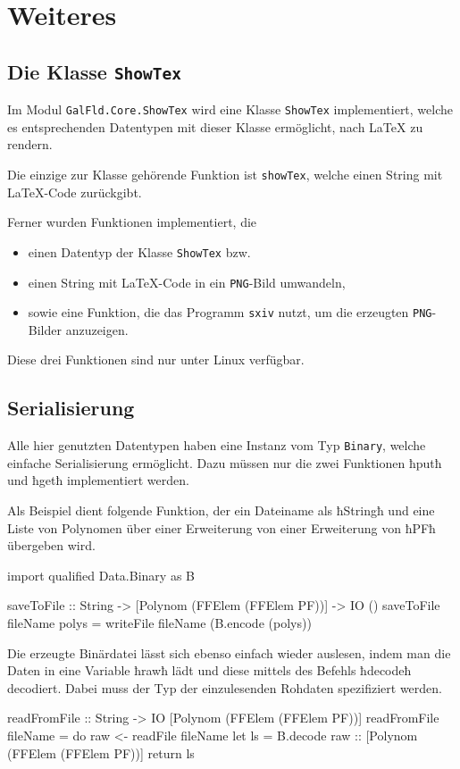 \section{Weiteres}
\subsection{Die Klasse \texttt{ShowTex}}
Im Modul \texttt{GalFld.Core.ShowTex} wird eine Klasse \texttt{ShowTex}
implementiert, welche es entsprechenden Datentypen mit dieser Klasse
ermöglicht, nach \LaTeX{} zu rendern.

Die einzige zur Klasse gehörende Funktion ist \texttt{showTex}, welche einen
String mit \LaTeX{}-Code zurückgibt.

Ferner wurden Funktionen implementiert, die 
\begin{itemize}
  \item einen Datentyp der Klasse \texttt{ShowTex} bzw.
  \item einen String mit \LaTeX{}-Code in ein \texttt{PNG}-Bild umwandeln,
  \item sowie eine Funktion, die das Programm \texttt{sxiv} nutzt, 
    um die erzeugten \texttt{PNG}-Bilder anzuzeigen.
\end{itemize}
Diese drei Funktionen sind nur unter Linux verfügbar.


\subsection{Serialisierung}
Alle hier genutzten Datentypen haben eine Instanz vom Typ \texttt{Binary},
welche einfache Serialisierung ermöglicht. Dazu müssen nur die zwei Funktionen
ħputħ und ħgetħ implementiert werden.

Als Beispiel dient folgende Funktion, der ein Dateiname als
ħStringħ und eine Liste von Polynomen über einer Erweiterung von
einer Erweiterung von ħPFħ übergeben wird.
\begin{hcode}
import qualified Data.Binary as B

saveToFile :: String -> [Polynom (FFElem (FFElem PF))] -> IO ()
saveToFile fileName polys = writeFile fileName (B.encode (polys))
\end{hcode}

Die erzeugte Binärdatei lässt sich ebenso einfach wieder auslesen, 
indem man die
Daten in eine Variable ħrawħ lädt und diese mittels des Befehls
ħdecodeħ decodiert. Dabei muss der Typ der einzulesenden Rohdaten spezifiziert
werden.
\begin{hcode}
readFromFile :: String -> IO [Polynom (FFElem (FFElem PF))]
readFromFile fileName = do
  raw <- readFile fileName
  let ls = B.decode raw :: [Polynom (FFElem (FFElem PF))]
  return ls
\end{hcode}

